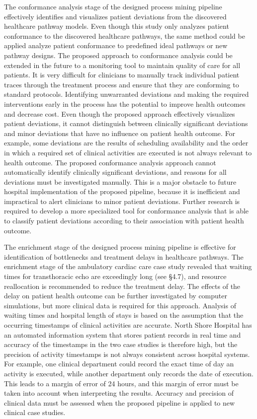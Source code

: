 The conformance analysis stage of the designed process mining pipeline effectively identifies and visualizes patient deviations from the discovered healthcare pathway models. Even though this study only analyzes patient conformance to the discovered healthcare pathways, the same method could be applied analyze patient conformance to predefined ideal pathways or new pathway designs. The proposed approach to conformance analysis could be extended in the future to a monitoring tool to maintain quality of care for all patients. It is very difficult for clinicians to manually track individual patient traces through the treatment process and ensure that they are conforming to standard protocols. Identifying unwarranted deviations and making the required interventions early in the process has the potential to improve health outcomes and decrease cost. Even though the proposed approach effectively visualizes patient deviations, it cannot distinguish between clinically significant deviations and minor deviations that have no influence on patient health outcome. For example, some deviations are the results of scheduling availability and the order in which a required set of clinical activities are executed is not always relevant to health outcome. The proposed conformance analysis approach cannot automatically identify clinically significant deviations, and reasons for all deviations must be investigated manually. This is a major obstacle to future hospital implementation of the proposed pipeline, because it is inefficient and impractical to alert clinicians to minor patient deviations. Further research is required to develop a more specialized tool for conformance analysis that is able to classify patient deviations according to their association with patient health outcome.

The enrichment stage of the designed process mining pipeline is effective for identification of bottlenecks and treatment delays in healthcare pathways. The enrichment stage of the ambulatory cardiac care case study revealed that waiting times for transthoracic echo are exceedingly long (see §4.7), and resource reallocation is recommended to reduce the treatment delay. The effects of the delay on patient health outcome can be further investigated by computer simulations, but more clinical data is required for this approach. Analysis of waiting times and hospital length of stays is based on the assumption that the occurring timestamps of clinical activities are accurate. North Shore Hospital has an automated information system that stores patient records in real time and accuracy of the timestamps in the two case studies is therefore high, but the precision of activity timestamps is not always consistent across hospital systems. For example, one clinical department could record the exact time of day an activity is executed, while another department only records the date of execution. This leads to a margin of error of 24 hours, and this margin of error must be taken into account when interpreting the results. Accuracy and precision of clinical data must be assessed when the proposed pipeline is applied to new clinical case studies.

